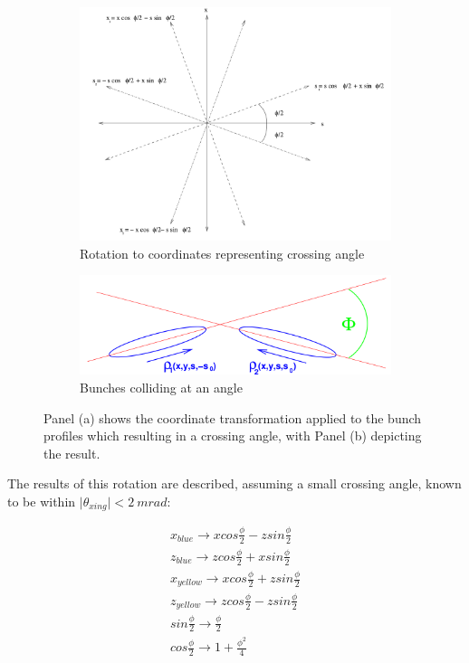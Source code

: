 \begin{figure}[ht]
  \centering
  \begin{subfigure}[b]{\textwidth}
    \centering
    \includegraphics[width=\linewidth]{./figures/bunch_rotation.png}
    \caption{Rotation to coordinates representing crossing angle~\cite{Herr2003a}}
  \end{subfigure}
  \begin{subfigure}[b]{\textwidth}
    \centering
    \includegraphics[width=\linewidth]{./figures/xing_bunch.png}
    \caption{Bunches colliding at an angle~\cite{Herr2003a}}
  \end{subfigure}
  \caption{
    Panel (a) shows the coordinate transformation applied to the bunch profiles
    which resulting in a crossing angle, with Panel (b) depicting the result.
  }
  \label{fig:bunch_transform}
\end{figure}
\clearpage
{\noindent}The results of this rotation are described, assuming a small crossing
angle, known to be within $\vert\theta_{xing}\vert < 2~mrad$:

\begin{gather}
\label{eq:transformations}
x_{blue}   \rightarrow x cos \frac{\phi}{2} - z sin \frac{\phi}{2} \\
z_{blue}   \rightarrow z cos \frac{\phi}{2} + x sin \frac{\phi}{2} \\
x_{yellow} \rightarrow x cos \frac{\phi}{2} + z sin \frac{\phi}{2} \\
z_{yellow} \rightarrow z cos \frac{\phi}{2} - z sin \frac{\phi}{2} \\
sin \frac {\phi}{2} \rightarrow \frac{\phi}{2} \\
cos \frac {\phi}{2} \rightarrow 1 + \frac{\phi^2}{4}
\end{gather}

